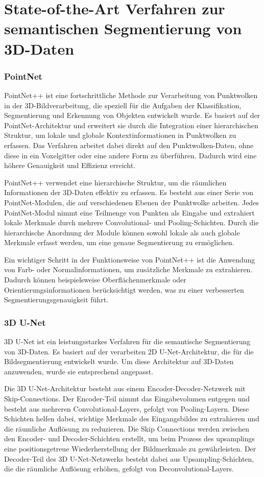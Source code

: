 \chapter{State-of-the-Art Verfahren zur semantischen Segmentierung von 3D-Daten}
\subsection{PointNet}
PointNet++ ist eine fortschrittliche Methode zur Verarbeitung von Punktwolken
in der 3D-Bildverarbeitung, die speziell für die Aufgaben der Klassifikation,
Segmentierung und Erkennung von Objekten entwickelt wurde. Es basiert auf der
PointNet-Architektur und erweitert sie durch die Integration einer
hierarchischen Struktur, um lokale und globale Kontextinformationen in
Punktwolken zu erfassen. Das Verfahren arbeitet dabei direkt auf den
Punktwolken-Daten, ohne diese in ein Voxelgitter oder eine andere Form zu
überführen. Dadurch wird eine höhere Genauigkeit und Effizienz erreicht.

PointNet++ verwendet eine hierarchische Struktur, um die räumlichen
Informationen der 3D-Daten effektiv zu erfassen. Es besteht aus einer Serie von
PointNet-Modulen, die auf verschiedenen Ebenen der Punktwolke arbeiten. Jedes
PointNet-Modul nimmt eine Teilmenge von Punkten als Eingabe und extrahiert
lokale Merkmale durch mehrere Convolutional- und Pooling-Schichten. Durch die
hierarchische Anordnung der Module können sowohl lokale als auch globale
Merkmale erfasst werden, um eine genaue Segmentierung zu ermöglichen.

Ein wichtiger Schritt in der Funktionsweise von PointNet++ ist die Anwendung
von Farb- oder Normalinformationen, um zusätzliche Merkmale zu extrahieren.
Dadurch können beispielsweise Oberflächenmerkmale oder
Orientierungsinformationen berücksichtigt werden, was zu einer verbesserten
Segmentierungsgenauigkeit führt.

\subsection{3D U-Net}

3D U-Net ist ein leistungsstarkes Verfahren für die semantische Segmentierung von 3D-Daten.
Es basiert auf der verarbeiten 2D U-Net-Architektur, die für die Bildsegmentierung entwickelt wurde.
Um diese Architektur auf 3D-Daten anzuwenden, wurde sie entsprechend angepasst.

Die 3D U-Net-Architektur besteht aus einem Encoder-Decoder-Netzwerk mit
Skip-Connections. Der Encoder-Teil nimmt das Eingabevolumen entgegen und
besteht aus mehreren Convolutional-Layers, gefolgt von Pooling-Layern. Diese
Schichten helfen dabei, wichtige Merkmale des Eingangsbildes zu extrahieren und
die räumliche Auflösung zu reduzieren. Die Skip Connections werden zwischen den
Encoder- und Decoder-Schichten erstellt, um beim Prozess des upsamplings eine
positionsgetreue Wiederherstellung der Bildmerkmale zu gewährleisten.
Der Decoder-Teil des 3D U-Net-Netzwerks besteht dabei aus Upsampling-Schichten, die
die räumliche Auflösung erhöhen, gefolgt von Deconvolutional-Layers. 

